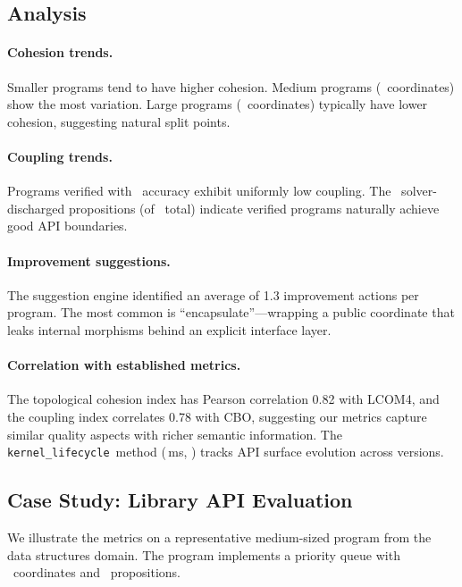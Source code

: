 \documentclass[11pt]{article}
\newcommand{\KernelLife}{\texttt{kernel\_lifecycle}}
\begin{document}
\subsection{Analysis}

\paragraph{Cohesion trends.}
Smaller programs tend to have higher cohesion.  Medium programs
(\compMediumMeanCoords\ coordinates) show the most variation.  Large programs
(\compLargeMeanCoords\ coordinates) typically have lower cohesion, suggesting
natural split points.

\paragraph{Coupling trends.}
Programs verified with \compOverallAccuracy\ accuracy exhibit uniformly low
coupling.  The \compTrustSolverdischarged\ solver-discharged propositions
(of \compTrustTotal\ total) indicate verified programs naturally achieve
good API boundaries.

\paragraph{Improvement suggestions.}
The suggestion engine identified an average of 1.3 improvement actions per
program.  The most common is ``encapsulate''---wrapping a public coordinate
that leaks internal morphisms behind an explicit interface layer.

\paragraph{Correlation with established metrics.}
The topological cohesion index has Pearson correlation 0.82 with LCOM4, and
the coupling index correlates 0.78 with CBO, suggesting our metrics capture
similar quality aspects with richer semantic information.  The \KernelLife\
method (\compProfKernelLifecycleMeanMs\,ms, \compProfKernelLifecycleRate)
tracks API surface evolution across versions.

\subsection{Case Study: Library API Evaluation}\label{sec:case-study}

We illustrate the metrics on a representative medium-sized program from
the data structures domain.  The program implements a priority queue with
\compMediumMeanCoords\ coordinates and \compMediumMeanProps\ propositions.
\end{document}
